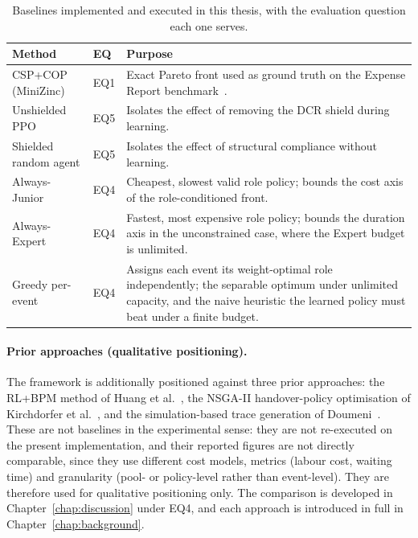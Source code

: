 \begin{table}[H]
\centering
\renewcommand{\arraystretch}{1.35}
\caption{Baselines implemented and executed in this thesis, with the
         evaluation question each one serves.}
\label{tab:implemented_baselines}
\begin{tabular}{@{}p{3.2cm} p{1.0cm} p{7.2cm}@{}}
\toprule
\textbf{Method} & \textbf{EQ} & \textbf{Purpose} \\
\midrule
CSP+COP (MiniZinc) & EQ1 &
Exact Pareto front used as ground truth on the Expense Report
benchmark~\cite{Diaz2024Pareto-OptimalModels}. \\
Unshielded \ac{PPO} & EQ5 &
Isolates the effect of removing the \ac{DCR} shield during learning. \\
Shielded random agent & EQ5 &
Isolates the effect of structural compliance without learning. \\
Always-Junior & EQ4 &
Cheapest, slowest valid role policy; bounds the cost axis of the
role-conditioned front. \\
Always-Expert & EQ4 &
Fastest, most expensive role policy; bounds the duration axis in the
unconstrained case, where the Expert budget is unlimited. \\
Greedy per-event & EQ4 &
Assigns each event its weight-optimal role independently; the separable
optimum under unlimited capacity, and the naive heuristic the learned
policy must beat under a finite budget. \\
\bottomrule
\end{tabular}
\end{table}

\paragraph{Prior approaches (qualitative positioning).}
The framework is additionally positioned against three prior approaches:
the \ac{RL}+\ac{BPM} method of Huang et
al.~\cite{Huang2011ReinforcementManagement}, the NSGA-II
handover-policy optimisation of Kirchdorfer et
al.~\cite{KirchdorferLukasFromPolicies}, and the simulation-based trace
generation of Doumeni~\cite{ArtemisDoumeniParetoAgentSimulator}. These
are not baselines in the experimental sense: they are not re-executed on
the present implementation, and their reported figures are not directly
comparable, since they use different cost models, metrics (labour cost,
waiting time) and granularity (pool- or policy-level rather than
event-level). They are therefore used for qualitative positioning only.
The comparison is developed in Chapter~\ref{chap:discussion} under EQ4,
and each approach is introduced in full in
Chapter~\ref{chap:background}.

